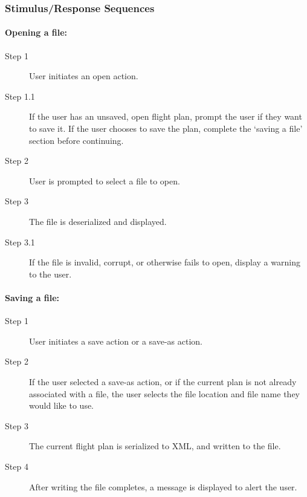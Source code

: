 \documentclass[12pt, letterpaper]{article}
\begin{document}
          \subsubsection{Stimulus/Response Sequences}
            \paragraph{Opening a file:}
            \begin{description}
              \item[Step 1] User initiates an open action.
              \item[Step 1.1] If the user has an unsaved, open flight plan, prompt the user if they want to save it.
                If the user chooses to save the plan, complete the `saving a file' section before continuing.
              \item[Step 2] User is prompted to select a file to open.
              \item[Step 3] The file is deserialized and displayed.
              \item[Step 3.1] If the file is invalid, corrupt, or otherwise fails to open, display a warning to the user.
            \end{description}
            \paragraph{Saving a file:}
            \begin{description}
              \item[Step 1] User initiates a save action or a save-as action.
              \item[Step 2] If the user selected a save-as action, or if the current plan is not already associated with a file,
                the user selects the file location and file name they would like to use.
              \item[Step 3] The current flight plan is serialized to XML, and written to the file.
              \item[Step 4] After writing the file completes, a message is displayed to alert the user.
            \end{description}
\end{document}
